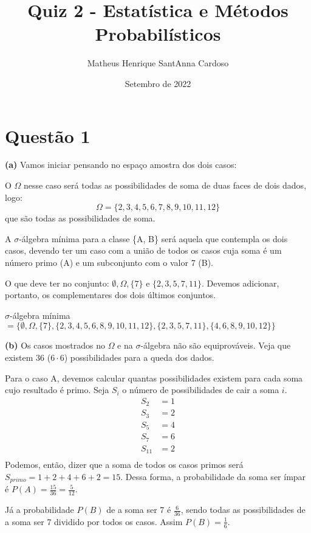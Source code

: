 \documentclass[12pt,a4paper]{article}
\author{Matheus Henrique SantAnna Cardoso}
\title{Quiz 2 - Estatística e Métodos Probabilísticos}
\date{Setembro de 2022}
\begin{document}
\maketitle

\section{Questão 1}
\textbf{(a)} Vamos iniciar pensando no espaço amostra dos dois casos:

O $\Omega$ nesse caso será todas as possibilidades de soma de duas faces de dois dados, logo:
\[\Omega = \{2, 3, 4, 5, 6, 7, 8, 9, 10, 11, 12\}\]
que são todas as possibilidades de soma.

A $\sigma$-álgebra mínima para a classe \{A, B\} será aquela que contempla os dois casos, devendo ter um caso com a união de todos os casos cuja soma é um número primo (A) e um subconjunto com o valor 7 (B).

O que deve ter no conjunto: $\emptyset, \Omega, \{7\}$ e $\{2, 3, 5, 7, 11\}$. Devemos adicionar, portanto, os complementares dos dois últimos conjuntos.

$\sigma$-álgebra mínima $= \{\emptyset, \Omega, \{7\}, \{2, 3, 4, 5, 6, 8, 9, 10, 11, 12\}, \{2, 3, 5, 7, 11\}, \{4, 6, 8, 9, 10, 12\}\}$

\vspace{\baselineskip}

\noindent \textbf{(b)} Os casos mostrados no $\Omega$ e na $\sigma$-álgebra não são equiprováveis. Veja que existem 36 ($6 \cdot 6$) possibilidades para a queda dos dados.

Para o caso A, devemos calcular quantas possibilidades existem para cada soma cujo resultado é primo. Seja $S_{i}$ o número de possibilidades de cair a soma $i$.
\begin{align*}
	S_{2}  &= 1\\
	S_{3}  &= 2\\
	S_{5}  &= 4\\
	S_{7}  &= 6\\
	S_{11} &= 2\\
\end{align*}
Podemos, então, dizer que a soma de todos os casos primos será $S_{primo} = 1 + 2 + 4 + 6 + 2 = 15$.
Dessa forma, a probabilidade da soma ser ímpar é $P(A) = \frac{15}{36} = \frac{5}{12}$.

Já a probabilidade $P(B)$ de a soma ser 7 é $\frac{6}{36}$, sendo todas as possibilidades de a soma ser 7 dividido por todos os casos. Assim $P(B) = \frac{1}{6}$.
\end{document}
